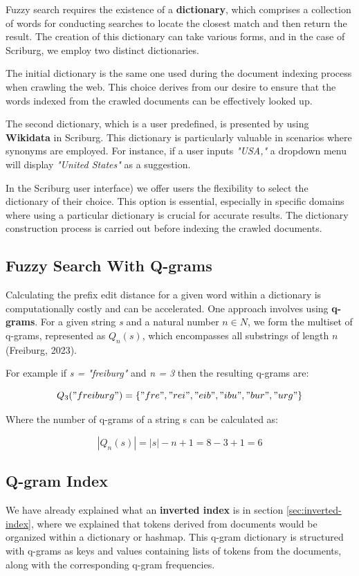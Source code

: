 Fuzzy search requires the existence of a \textbf{dictionary}, which comprises a collection of words for conducting searches to locate the closest match and then return the result. The creation of this dictionary can take various forms, and in the case of Scriburg, we employ two distinct dictionaries.

The initial dictionary is the same one used during the document indexing process when crawling the web. This choice derives from our desire to ensure that the words indexed from the crawled documents can be effectively looked up.

The second dictionary, which is a user predefined, is presented by using \textbf{Wikidata} in Scriburg. This dictionary is particularly valuable in scenarios where synonyms are employed. For instance, if a user inputs \textit{"USA,"} a dropdown menu will display \textit{"United States"} as a suggestion.

In the Scriburg user interface) we offer users the flexibility to select the dictionary of their choice. This option is essential, especially in specific domains where using a particular dictionary is crucial for accurate results. The dictionary construction process is carried out before indexing the crawled documents.

\subsection{Fuzzy Search With Q-grams}\label{sec:q-gram-fuzzy}
Calculating the prefix edit distance for a given word within a dictionary is computationally costly and can be accelerated. One approach involves using \textbf{q-grams}. For a given string \textit{s} and a natural number $n \in N$,  we form the multiset of q-grams, represented as $Q_n(s)$, which encompasses all substrings of length $n$ (Freiburg, 2023).


For example if \textit{s = "freiburg"} and \textit{n = 3} then the resulting q-grams are:

\begin{equation*}
Q_3("freiburg") = \{ "fre", "rei", "eib", "ibu", "bur", "urg"\}
\end{equation*}

Where the number of q-grams of a string s can be calculated as:

\begin{equation*}
|Q_n(s)| = |s| - n + 1 = 8 - 3 + 1 = 6
\end{equation*}

\subsection{Q-gram Index}
We have already explained what an \textbf{inverted index} is in section \ref{sec:inverted-index}, where we explained that tokens derived from documents would be organized within a dictionary or hashmap. This q-gram dictionary is structured with q-grams as keys and values containing lists of tokens from the documents, along with the corresponding q-gram frequencies.


